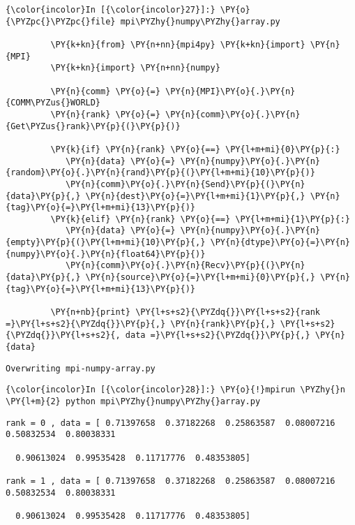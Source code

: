     \begin{Verbatim}[commandchars=\\\{\}]
{\color{incolor}In [{\color{incolor}27}]:} \PY{o}{\PYZpc{}\PYZpc{}file} mpi\PYZhy{}numpy\PYZhy{}array.py
         
         \PY{k+kn}{from} \PY{n+nn}{mpi4py} \PY{k+kn}{import} \PY{n}{MPI}
         \PY{k+kn}{import} \PY{n+nn}{numpy}
         
         \PY{n}{comm} \PY{o}{=} \PY{n}{MPI}\PY{o}{.}\PY{n}{COMM\PYZus{}WORLD}
         \PY{n}{rank} \PY{o}{=} \PY{n}{comm}\PY{o}{.}\PY{n}{Get\PYZus{}rank}\PY{p}{(}\PY{p}{)}
         
         \PY{k}{if} \PY{n}{rank} \PY{o}{==} \PY{l+m+mi}{0}\PY{p}{:}
            \PY{n}{data} \PY{o}{=} \PY{n}{numpy}\PY{o}{.}\PY{n}{random}\PY{o}{.}\PY{n}{rand}\PY{p}{(}\PY{l+m+mi}{10}\PY{p}{)}
            \PY{n}{comm}\PY{o}{.}\PY{n}{Send}\PY{p}{(}\PY{n}{data}\PY{p}{,} \PY{n}{dest}\PY{o}{=}\PY{l+m+mi}{1}\PY{p}{,} \PY{n}{tag}\PY{o}{=}\PY{l+m+mi}{13}\PY{p}{)}
         \PY{k}{elif} \PY{n}{rank} \PY{o}{==} \PY{l+m+mi}{1}\PY{p}{:}
            \PY{n}{data} \PY{o}{=} \PY{n}{numpy}\PY{o}{.}\PY{n}{empty}\PY{p}{(}\PY{l+m+mi}{10}\PY{p}{,} \PY{n}{dtype}\PY{o}{=}\PY{n}{numpy}\PY{o}{.}\PY{n}{float64}\PY{p}{)}
            \PY{n}{comm}\PY{o}{.}\PY{n}{Recv}\PY{p}{(}\PY{n}{data}\PY{p}{,} \PY{n}{source}\PY{o}{=}\PY{l+m+mi}{0}\PY{p}{,} \PY{n}{tag}\PY{o}{=}\PY{l+m+mi}{13}\PY{p}{)}
             
         \PY{n+nb}{print} \PY{l+s+s2}{\PYZdq{}}\PY{l+s+s2}{rank =}\PY{l+s+s2}{\PYZdq{}}\PY{p}{,} \PY{n}{rank}\PY{p}{,} \PY{l+s+s2}{\PYZdq{}}\PY{l+s+s2}{, data =}\PY{l+s+s2}{\PYZdq{}}\PY{p}{,} \PY{n}{data}
\end{Verbatim}

    \begin{Verbatim}[commandchars=\\\{\}]
Overwriting mpi-numpy-array.py

    \end{Verbatim}

    \begin{Verbatim}[commandchars=\\\{\}]
{\color{incolor}In [{\color{incolor}28}]:} \PY{o}{!}mpirun \PYZhy{}n \PY{l+m}{2} python mpi\PYZhy{}numpy\PYZhy{}array.py
\end{Verbatim}

    \begin{Verbatim}[commandchars=\\\{\}]
rank = 0 , data = [ 0.71397658  0.37182268  0.25863587  0.08007216  0.50832534  0.80038331

  0.90613024  0.99535428  0.11717776  0.48353805]

rank = 1 , data = [ 0.71397658  0.37182268  0.25863587  0.08007216  0.50832534  0.80038331

  0.90613024  0.99535428  0.11717776  0.48353805]


    \end{Verbatim}



